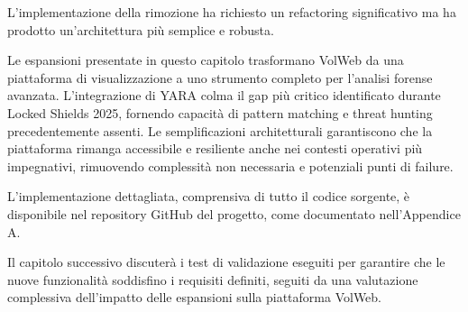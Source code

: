 L'implementazione della rimozione ha richiesto un refactoring significativo ma ha prodotto un'architettura più semplice e robusta. 

Le espansioni presentate in questo capitolo trasformano VolWeb da una piattaforma di visualizzazione a uno strumento completo per l'analisi forense avanzata. L'integrazione di YARA colma il gap più critico identificato durante Locked Shields 2025, fornendo capacità di pattern matching e threat hunting precedentemente assenti. Le semplificazioni architetturali garantiscono che la piattaforma rimanga accessibile e resiliente anche nei contesti operativi più impegnativi, rimuovendo complessità non necessaria e potenziali punti di failure.

L'implementazione dettagliata, comprensiva di tutto il codice sorgente, è disponibile nel repository GitHub del progetto, come documentato nell'Appendice A.

Il capitolo successivo discuterà i test di validazione eseguiti per garantire che le nuove funzionalità soddisfino i requisiti definiti, seguiti da una valutazione complessiva dell'impatto delle espansioni sulla piattaforma VolWeb.
